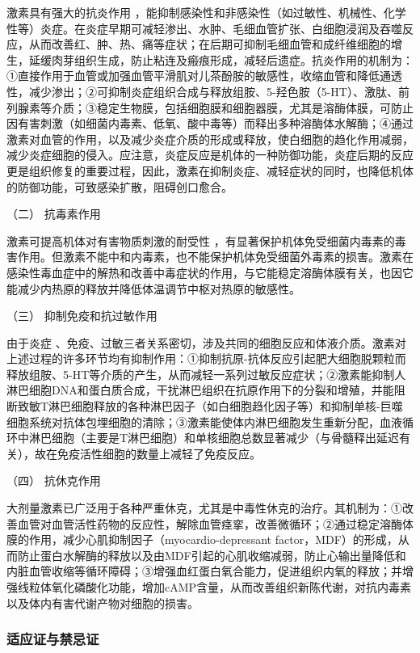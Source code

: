 激素具有强大的抗炎作用
，能抑制感染性和非感染性（如过敏性、机械性、化学性等）炎症。在炎症早期可减轻渗出、水肿、毛细血管扩张、白细胞浸润及吞噬反应，从而改善红、肿、热、痛等症状；在后期可抑制毛细血管和成纤维细胞的增生，延缓肉芽组织生成，防止粘连及瘢痕形成，减轻后遗症。抗炎作用的机制为：①直接作用于血管或加强血管平滑肌对儿茶酚胺的敏感性，收缩血管和降低通透性，减少渗出；②可抑制炎症组织合成与释放组胺、5-羟色胺（5-HT）、激肽、前列腺素等介质；③稳定生物膜，包括细胞膜和细胞器膜，尤其是溶酶体膜，可防止因有害刺激（如细菌内毒素、低氧、酸中毒等）而释出多种溶酶体水解酶；④通过激素对血管的作用，以及减少炎症介质的形成或释放，使白细胞的趋化作用减弱，减少炎症细胞的侵入。应注意，炎症反应是机体的一种防御功能，炎症后期的反应更是组织修复的重要过程，因此，激素在抑制炎症、减轻症状的同时，也降低机体的防御功能，可致感染扩散，阻碍创口愈合。

\hypertarget{text00428.htmlux5cux23CHP17-6-1-2}{}
（二） 抗毒素作用

激素可提高机体对有害物质刺激的耐受性
，有显著保护机体免受细菌内毒素的毒害作用。但激素不能中和内毒素，也不能保护机体免受细菌外毒素的损害。激素在感染性毒血症中的解热和改善中毒症状的作用，与它能稳定溶酶体膜有关，也因它能减少内热原的释放并降低体温调节中枢对热原的敏感性。

\hypertarget{text00428.htmlux5cux23CHP17-6-1-3}{}
（三） 抑制免疫和抗过敏作用

由于炎症
、免疫、过敏三者关系密切，涉及共同的细胞反应和体液介质。激素对上述过程的许多环节均有抑制作用：①抑制抗原-抗体反应引起肥大细胞脱颗粒而释放组胺、5-HT等介质的产生，从而减轻一系列过敏反应症状；②激素能抑制人淋巴细胞DNA和蛋白质合成，干扰淋巴组织在抗原作用下的分裂和增殖，并能阻断致敏T淋巴细胞释放的各种淋巴因子（如白细胞趋化因子等）和抑制单核-巨噬细胞系统对抗体包埋细胞的清除；③激素能使体内淋巴细胞发生重新分配，血液循环中淋巴细胞（主要是T淋巴细胞）和单核细胞总数显著减少（与骨髓释出延迟有关），故在免疫活性细胞的数量上减轻了免疫反应。

\hypertarget{text00428.htmlux5cux23CHP17-6-1-4}{}
（四） 抗休克作用

大剂量激素已广泛用于各种严重休克，尤其是中毒性休克的治疗。其机制为：①改善血管对血管活性药物的反应性，解除血管痉挛，改善微循环；②通过稳定溶酶体膜的作用，减少心肌抑制因子（myocardio-depressant
factor，MDF）的形成，从而防止蛋白水解酶的释放以及由MDF引起的心肌收缩减弱，防止心输出量降低和内脏血管收缩等循环障碍；③增强血红蛋白氧合能力，促进组织内氧的释放；并增强线粒体氧化磷酸化功能，增加cAMP含量，从而改善组织新陈代谢，对抗内毒素以及体内有害代谢产物对细胞的损害。

\subsubsection{适应证与禁忌证}

